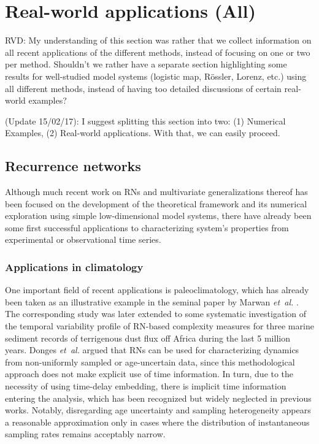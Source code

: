 \section{Real-world applications {\bf{(All)}}}

RVD: My understanding of this section was rather that we collect information on all recent applications of the different methods, instead of focusing on one or two per method. Shouldn't we rather have a separate section highlighting some results for well-studied model systems (logistic map, R\"ossler, Lorenz, etc.) using all different methods, instead of having too detailed discussions of certain real-world examples?

(Update 15/02/17): I suggest splitting this section into two: (1) Numerical Examples, (2) Real-world applications. With that, we can easily proceed.

\subsection{Recurrence networks}

Although much recent work on RNs and multivariate generalizations thereof has been focused on the development of the theoretical framework and its numerical exploration using simple low-dimensional model systems, there have already been some first successful applications to characterizing system's properties from experimental or observational time series.


\subsubsection{Applications in climatology}

One important field of recent applications is paleoclimatology, which has already been taken as an illustrative example in the seminal paper by Marwan \textit{et~al.} \cite{Marwan2009}. The corresponding study was later extended to some systematic investigation of the temporal variability profile of RN-based complexity measures for three marine sediment records of terrigenous dust flux off Africa during the last 5 million years. Donges \textit{et~al.} \cite{Donges2011NPG} argued that RNs can be used for characterizing dynamics from non-uniformly sampled or age-uncertain data, since this methodological approach does not make explicit use of time information. In turn, due to the necessity of using time-delay embedding, there is implicit time information entering the analysis, which has been recognized but widely neglected in previous works. Notably, disregarding age uncertainty and sampling heterogeneity appears a reasonable approximation only in cases where the distribution of instantaneous sampling rates remains acceptably narrow. 

